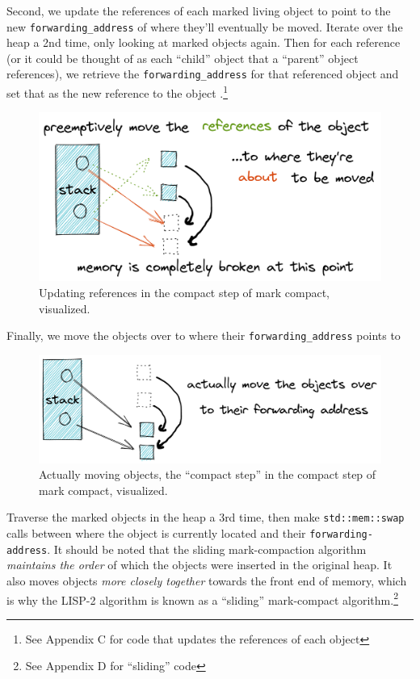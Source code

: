 \documentclass[index]{subfiles}
\begin{document}
Second, we update the references of each marked living object to point to the new \verb+forwarding_address+ of where they'll eventually be moved. Iterate over the heap a 2nd time, only looking at marked objects again. Then for each reference (or it could be thought of as each ``child'' object that a ``parent'' object references), we retrieve the \verb+forwarding_address+ for that referenced object and set that as the new reference to the object \cites[Chapter 3]{gc_handbook}[Sec.~3.4]{redhat_openjdk}.\footnote{See Appendix C for code that updates the references of each object}

\begin{figure}[H]
    \centering
    \includegraphics[scale=0.3]{pics/update-references.png}
    \caption{Updating references in the compact step of mark compact, visualized.}
\end{figure}

Finally, we move the objects over to where their \verb+forwarding_address+ points to

\begin{figure}[H]
    \centering
    \includegraphics[scale=0.25]{pics/actually-move.png}
    \caption{Actually moving objects, the ``compact step'' in the compact step of mark compact, visualized.}
\end{figure}

Traverse the marked objects in the heap a 3rd time, then make \texttt{std::mem::swap} calls between where the object is currently located and their \verb+forwarding-address+. It should be noted that the sliding mark-compaction algorithm \textit{maintains the order} of which the objects were inserted in the original heap. It also moves objects \textit{more closely together} towards the front end of memory, which is why the LISP-2 algorithm is known as a ``sliding'' mark-compact algorithm.\footnote{See Appendix D for ``sliding'' code}
\end{document}
